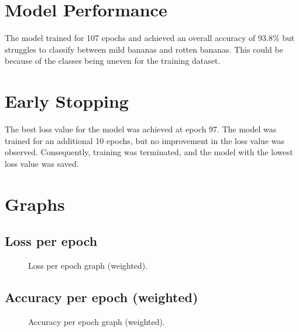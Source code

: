 \documentclass[a4paper,oneside,11pt]{book}
\begin{document}
\section{Model Performance}
The model trained for 107 epochs and achieved an overall accuracy of 93.8\% but struggles to classify between mild bananas and rotten bananas. This could be because of the classes being uneven for the training dataset.
\section{Early Stopping}
The best loss value for the model was achieved at epoch 97. The model was trained for an additional 10 epochs, but no improvement in the loss value was observed. Consequently, training was terminated, and the model with the lowest loss value was saved.
\section{Graphs}
\subsection{Loss per epoch}
\begin{figure}[H]
    \centering
    \caption{Loss per epoch graph (weighted).}
\end{figure}
\subsection{Accuracy per epoch (weighted)}
\begin{figure}[H]
    \centering
    \caption{Accuracy per epoch graph (weighted).}
\end{figure}
\end{document}
